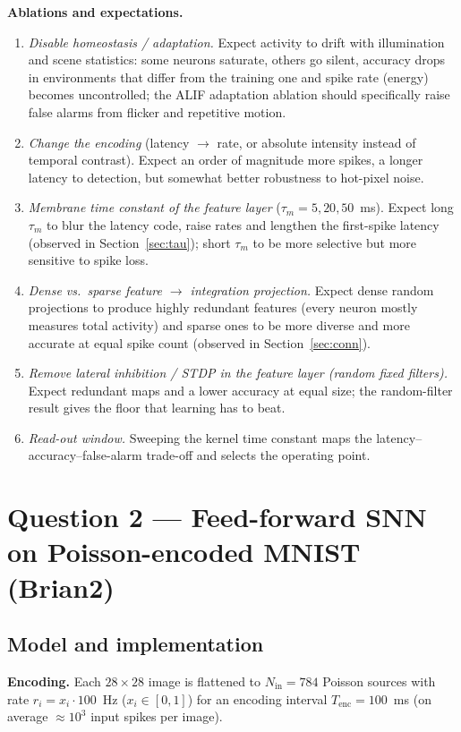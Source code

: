 \documentclass[11pt,a4paper]{article}
\begin{document}
\textbf{Ablations and expectations.}
\begin{enumerate}
\item \emph{Disable homeostasis / adaptation.} Expect activity to drift with illumination and scene statistics: some neurons saturate, others go silent, accuracy drops in environments that differ from the training one and spike rate (energy) becomes uncontrolled; the ALIF adaptation ablation should specifically raise false alarms from flicker and repetitive motion.
\item \emph{Change the encoding} (latency $\to$ rate, or absolute intensity instead of temporal contrast). Expect an order of magnitude more spikes, a longer latency to detection, but somewhat better robustness to hot-pixel noise.
\item \emph{Membrane time constant of the feature layer} ($\tau_m = 5, 20, 50$~ms). Expect long $\tau_m$ to blur the latency code, raise rates and lengthen the first-spike latency (observed in Section~\ref{sec:tau}); short $\tau_m$ to be more selective but more sensitive to spike loss.
\item \emph{Dense vs.\ sparse feature $\to$ integration projection.} Expect dense random projections to produce highly redundant features (every neuron mostly measures total activity) and sparse ones to be more diverse and more accurate at equal spike count (observed in Section~\ref{sec:conn}).
\item \emph{Remove lateral inhibition / STDP in the feature layer (random fixed filters).} Expect redundant maps and a lower accuracy at equal size; the random-filter result gives the floor that learning has to beat.
\item \emph{Read-out window.} Sweeping the kernel time constant maps the latency--accuracy--false-alarm trade-off and selects the operating point.
\end{enumerate}

\section{Question 2 --- Feed-forward SNN on Poisson-encoded MNIST (Brian2)}
\label{sec:q2}

\subsection{Model and implementation}

\textbf{Encoding.} Each $28\times28$ image is flattened to $N_{\mathrm{in}}=784$ Poisson sources with rate $r_i = x_i\cdot 100$~Hz ($x_i\in[0,1]$) for an encoding interval $T_{\mathrm{enc}}=100$~ms (on average $\approx 10^3$ input spikes per image).
\end{document}
